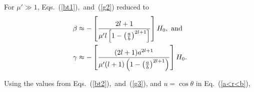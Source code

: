 For $\mu'\gg 1$, Eqs.~(\ref{bt1}),~and~(\ref{g2}) reduced to
\begin{align}
\beta &\approx-\left[\frac{2l+1}{\mu'l\left[1-\left(\frac{a}{b}\right)^{2l+1}\right]}\right]H_0{\rm ,~and}\label{bt2}\\
\gamma &\approx-\left[\frac{(2l+1)a^{2l+1}}{\mu'(l+1)\left(1-\left(\frac{a}{b}\right)^{2l+1}\right)}\right] H_0{\rm .}\label{g3}
\end{align}


Using the values from Eqs.~(\ref{bt2}),~and~(\ref{g3}), and $u=\cos\theta$ in Eq.~(\ref{a<r<b}),



